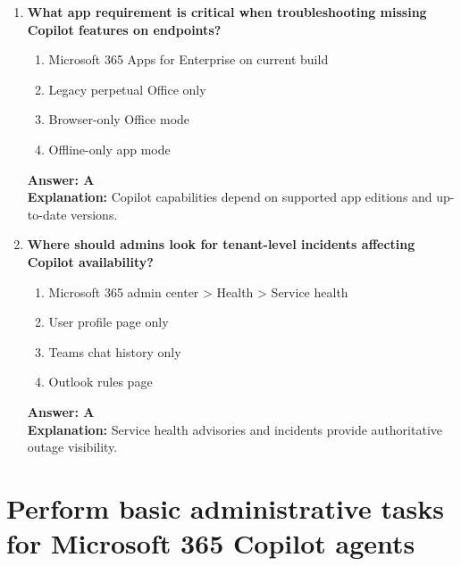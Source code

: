 \documentclass[10pt]{article}
\begin{document}
\begin{enumerate}[leftmargin=*]
\item \textbf{What app requirement is critical when troubleshooting missing Copilot features on endpoints?}
\begin{enumerate}[label=\Alph*.]
  \item Microsoft 365 Apps for Enterprise on current build
  \item Legacy perpetual Office only
  \item Browser-only Office mode
  \item Offline-only app mode
\end{enumerate}
\textbf{Answer: A}\\
\textbf{Explanation:} Copilot capabilities depend on supported app editions and up-to-date versions.

\item \textbf{Where should admins look for tenant-level incidents affecting Copilot availability?}
\begin{enumerate}[label=\Alph*.]
  \item Microsoft 365 admin center > Health > Service health
  \item User profile page only
  \item Teams chat history only
  \item Outlook rules page
\end{enumerate}
\textbf{Answer: A}\\
\textbf{Explanation:} Service health advisories and incidents provide authoritative outage visibility.

\end{enumerate}


\clearpage
\section{Perform basic administrative tasks for Microsoft 365 Copilot agents}
\setcounter{subsection}{0}
\clearpage
\end{document}
